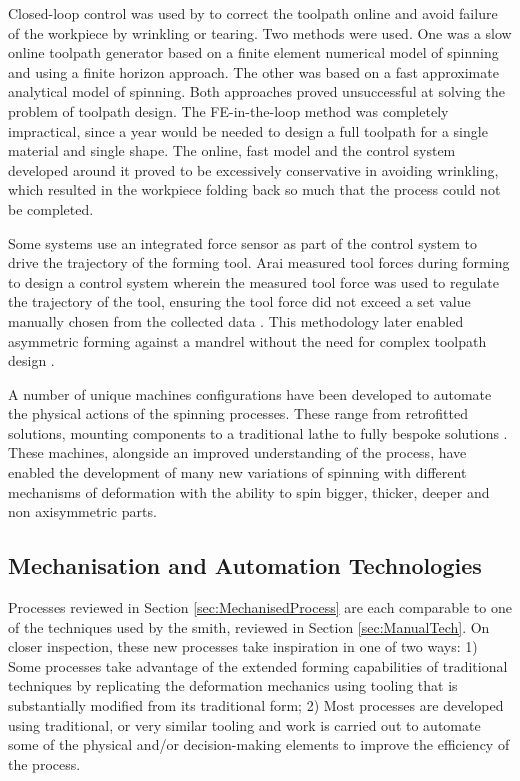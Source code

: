 Closed-loop control was used by \cite{Polyblank2015TheSpinning} to correct the toolpath online and avoid failure of the workpiece by wrinkling or tearing. Two methods were used. One was a slow online toolpath generator based on a finite element numerical model of spinning and using a finite horizon approach. The other was based on a fast approximate analytical model of spinning. Both approaches proved unsuccessful at solving the problem of toolpath design.  The FE-in-the-loop method was completely impractical, since a year would be needed to design a full toolpath for a single material and single shape. The online, fast model and the control system developed around it proved to be excessively conservative in avoiding wrinkling, which resulted in the workpiece folding back so much that the process could not be completed.  

Some systems use an integrated force sensor as part of the control system to drive the trajectory of the forming tool. 
Arai measured tool forces during forming to design a control system wherein the measured tool force was used to regulate the trajectory of the tool, ensuring the tool force did not exceed a set value manually chosen from the collected data \citep{Arai2003RoboticControl}. 
This methodology later enabled asymmetric forming against a mandrel without the need for complex toolpath design \citep{Arai2006Force-controlledMotors}.

A number of unique machines configurations have been developed to automate the physical actions of the spinning processes. These range from retrofitted solutions, mounting components to a traditional lathe \citep{Abd-Alrazzaq2019ARetrofit} to fully bespoke solutions \citep{Music2011FlexibleSpinning}. These machines, alongside an improved understanding of the process, have enabled the development of many new variations of spinning with different mechanisms of deformation \citep{Xia2014ASpinning} with the ability to spin bigger, thicker, deeper and non axisymmetric parts. 
 
 
\subsection{Mechanisation and Automation Technologies} \label{sec:MechandAuto}

Processes reviewed in Section \ref{sec:MechanisedProcess} are each comparable to one of the techniques used by the smith, reviewed in Section \ref{sec:ManualTech}. On closer inspection, these new processes take inspiration in one of two ways: 1) Some processes take advantage of the extended forming capabilities of traditional techniques by replicating the deformation mechanics using tooling that is substantially modified from its traditional form; 2) Most  processes are developed using traditional, or very similar tooling and work is carried out to automate some of the physical and/or decision-making elements to improve the efficiency of the process. 

